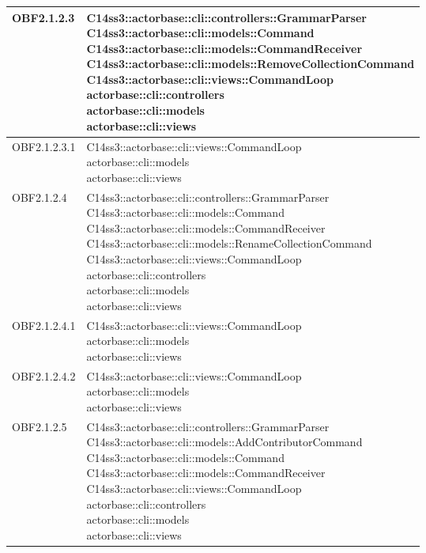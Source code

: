 \documentclass{scalatekids-article}
\begin{document}
\begin{longtable}[H]{|p{4.5cm}|p{13cm}|}
\hline
OBF2.1.2.3 & \multiLineCell[t]{C14ss3::actorbase::cli::controllers::GrammarParser\\C14ss3::actorbase::cli::models::Command\\C14ss3::actorbase::cli::models::CommandReceiver\\C14ss3::actorbase::cli::models::RemoveCollectionCommand\\C14ss3::actorbase::cli::views::CommandLoop\\actorbase::cli::controllers\\actorbase::cli::models\\actorbase::cli::views\\}\\
\hline
OBF2.1.2.3.1 & \multiLineCell[t]{C14ss3::actorbase::cli::views::CommandLoop\\actorbase::cli::models\\actorbase::cli::views\\}\\
\hline
OBF2.1.2.4 & \multiLineCell[t]{C14ss3::actorbase::cli::controllers::GrammarParser\\C14ss3::actorbase::cli::models::Command\\C14ss3::actorbase::cli::models::CommandReceiver\\C14ss3::actorbase::cli::models::RenameCollectionCommand\\C14ss3::actorbase::cli::views::CommandLoop\\actorbase::cli::controllers\\actorbase::cli::models\\actorbase::cli::views\\}\\
\hline
OBF2.1.2.4.1 & \multiLineCell[t]{C14ss3::actorbase::cli::views::CommandLoop\\actorbase::cli::models\\actorbase::cli::views\\}\\
\hline
OBF2.1.2.4.2 & \multiLineCell[t]{C14ss3::actorbase::cli::views::CommandLoop\\actorbase::cli::models\\actorbase::cli::views\\}\\
\hline
OBF2.1.2.5 & \multiLineCell[t]{C14ss3::actorbase::cli::controllers::GrammarParser\\C14ss3::actorbase::cli::models::AddContributorCommand\\C14ss3::actorbase::cli::models::Command\\C14ss3::actorbase::cli::models::CommandReceiver\\C14ss3::actorbase::cli::views::CommandLoop\\actorbase::cli::controllers\\actorbase::cli::models\\actorbase::cli::views\\}\\

\end{longtable}
\end{document}
